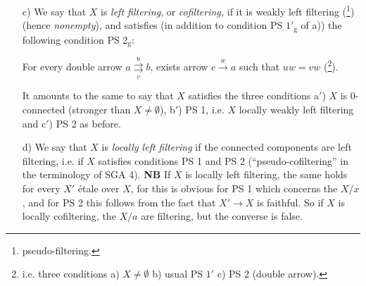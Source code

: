 \begin{enumerate}[label={},leftmargin=3em]

\textbf{NB} If $X$ locally weakly left filtering, every $X'$ étale over $X$ likewise.

\textbf{NB} (\footnote[17]{\textbf{False.}}) $X$ locally weakly left filtering $\Longleftrightarrow$ the connected components are weakly left filtering, or again if $X$ is 0-connected, $X$ locally weakly left filtering $\Longleftrightarrow$ $X$ is weakly left filtering (\footnote[18]{pseudo-filtering.}). We have indeed $\Longleftarrow$ tautologically (\footnote[19]{\textbf{false,} thus $0 \underset{\beta}{\overset{\alpha}{\rightrightarrows}} 1$ is 0-connected and weakly left filtering, but not locally weakly left filtering because
cannot be completed to a \textit{commutative} square.}), and $\Longrightarrow$ by showing that if PS 1 satisfied, then $PS(a,b)$ defined by $X/[a] \cap X/[b] \neq \emptyset$ is an equivalence relation, implied by the relation $C(a,b)$: $\{\operatorname{Hom}(a,b) \neq \emptyset$ \textit{or} $\operatorname{Hom}(b,a) \neq \emptyset\}$, hence the equivalence relation (homotopy) generated by $C(a,b)$ is finer than $PS(a,b)$.

\item[c)] We say that $X$ is \textit{left filtering}, or \textit{cofiltering,} if it is weakly left filtering (\footnote[20]{pseudo-filtering.}) (hence \textit{nonempty}), and satisfies (in addition to condition PS $1'_{\mathrm{g}}$ of a)) the following condition PS $2_{\mathrm{g}}$:

For every double arrow $a \underset{v}{\overset{u}{\rightrightarrows}} b$, exists arrow $c \xrightarrow{w} a$ such that $uw = vw$ (\footnote[21]{i.e. three conditions a) $X \neq \emptyset$ b) usual PS $1'$ c) PS 2 (double arrow).}).

It amounts to the same to say that $X$ satisfies the three conditions a$'$) $X$ is 0-connected (stronger than $X \neq \emptyset$), b$'$) PS 1, i.e. $X$ locally weakly left filtering and c$'$) PS 2 as before.

\item[d)] We say that $X$ is \textit{locally left filtering} if the connected components are left filtering, i.e. if $X$ satisfies conditions PS 1 and PS 2 (``pseudo-cofiltering'' in the terminology of SGA 4). \textbf{NB} If $X$ is locally left filtering, the same holds for every $X'$ étale over $X$, for this is obvious for PS 1 which concerns the $X/x$, and for PS 2 this follows from the fact that $X' \longrightarrow X$ is faithful. So if $X$ is locally cofiltering, the $X/a$ are filtering, but the converse is false.
\end{enumerate}

